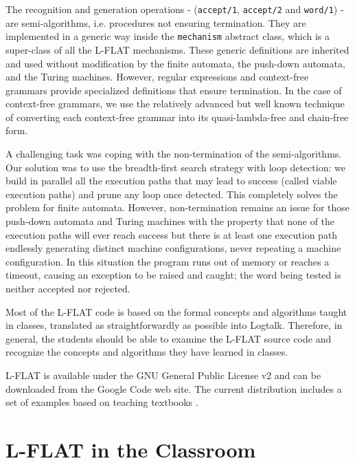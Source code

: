 \documentclass{llncs}
\begin{document}
The recognition and generation operations - (\lstinline{accept/1}, \lstinline{accept/2} and \lstinline{word/1}) - are semi-algorithms, i.e. procedures not ensuring termination. They are implemented in a generic way inside the \lstinline{mechanism} abstract class, which is a super-class of all the L-FLAT mechanisms. These generic definitions are inherited and used without modification by the finite automata, the push-down automata, and the Turing machines. However, regular expressions and context-free grammars provide specialized definitions that ensure termination. In the case of context-free grammars, we use the relatively advanced but well known technique of converting each context-free grammar into its quasi-lambda-free and chain-free form.

A challenging task was coping with the non-termination of the semi-algorithms. Our solution was to use the breadth-first search strategy with loop detection: we build in parallel all the execution paths that may lead to success (called viable execution paths) and prune any loop once detected. This completely solves the problem for finite automata. However, non-termination remains an issue for those push-down automata and Turing machines with the property that none of the execution paths will ever reach success but there is at least one execution path endlessly generating distinct machine configurations, never repeating a machine configuration. In this situation the program runs out of memory or reaches a timeout, causing an exception to be raised and caught; the word being tested is neither accepted nor rejected.

Most of the L-FLAT code is based on the formal concepts and algorithms taught in classes, translated as straightforwardly as possible into Logtalk. Therefore, in general, the students should be able to examine the L-FLAT source code and recognize the concepts and algorithms they have learned in classes.

L-FLAT is available under the GNU General Public License v2 and can be downloaded from the Google Code web site. The current distribution includes a set of examples based on teaching textbooks \cite{monteiro03}.


\section{L-FLAT in the Classroom}
\end{document}
